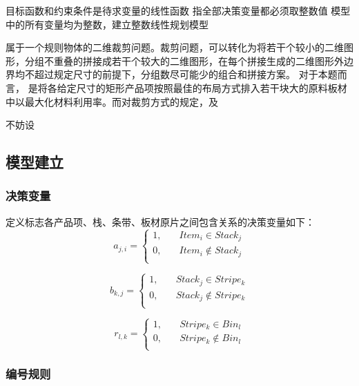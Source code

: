 \documentclass[bwprint]{gmcmthesis}
\begin{document}
目标函数和约束条件是待求变量的线性函数
指全部决策变量都必须取整数值
模型中的所有变量均为整数，建立整数线性规划模型

属于一个规则物体的二维裁剪问题。裁剪问题，可以转化为将若干个较小的二维图形，分组不重叠的拼接成若干个较大的二维图形，在每个拼接生成的二维图形外边界均不超过规定尺寸的前提下，分组数尽可能少的组合和拼接方案。
对于本题而言，
是将各给定尺寸的矩形产品项按照最佳的布局方式排入若干块大的原料板材中以最大化材料利用率。而对裁剪方式的规定，及

不妨设

\subsection{模型建立}

\subsubsection{决策变量}
定义标志各产品项、栈、条带、板材原片之间包含关系的决策变量如下：
\begin{equation}   %
    a_{j,i}=
    \begin{cases}
        1, \quad  & Item_i \in  Stack_j \\
        0,\quad  & Item_i  \notin  Stack_j \\
    \end{cases}
\end{equation}

\begin{equation}
    b_{k,j}=
    \begin{cases}
        1, \quad  & Stack_j \in  Stripe_k \\
        0,\quad  & Stack_j  \notin  Stripe_k \\
    \end{cases}
\end{equation}

\begin{equation}
    r_{l,k}=
    \begin{cases}
        1, \quad  & Stripe_k \in  Bin_l \\
        0,\quad  & Stripe_k  \notin  Bin_l \\
    \end{cases}
\end{equation}

\subsubsection{编号规则}
\end{document}
